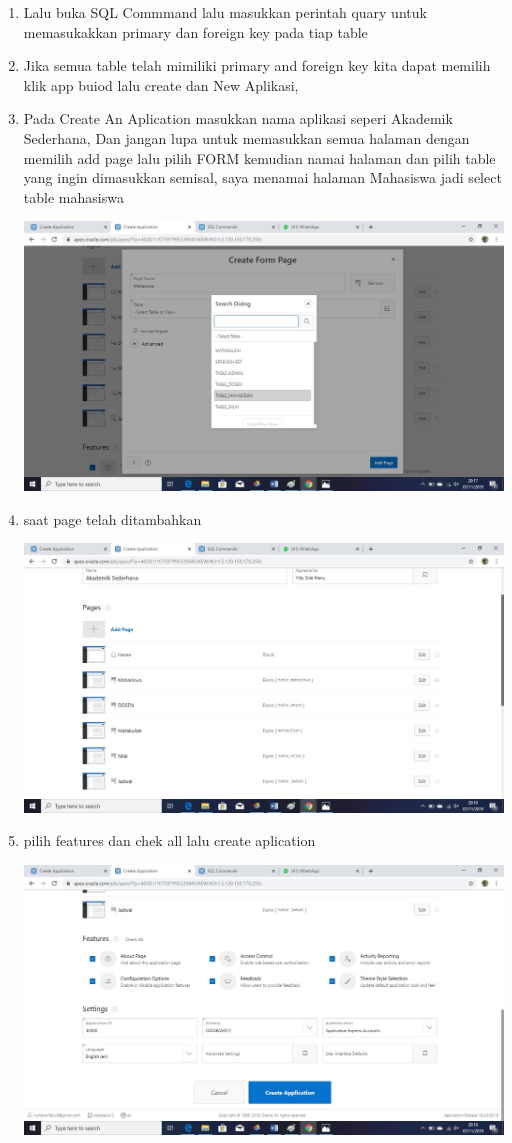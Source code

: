 \documentclass[a4paper,12pt]{report}
\begin{document}
\begin{enumerate}
\begin{center}
    \end{center}
    \item Lalu buka SQL Commmand lalu masukkan perintah quary untuk memasukakkan primary dan foreign key pada tiap table
    \item Jika semua table telah mimiliki primary and foreign key kita dapat memilih klik app buiod lalu create dan New Aplikasi,
    \item Pada Create An Aplication masukkan nama aplikasi seperi Akademik Sederhana, Dan jangan lupa untuk memasukkan semua halaman dengan memilih add page lalu pilih FORM kemudian namai halaman dan pilih table yang ingin dimasukkan semisal, saya menamai halaman Mahasiswa jadi select table mahasiswa
     \begin{center}
    \includegraphics[width=11cm\textwidth]{figure/17.jpg}
    \end{center}
    \item saat page telah ditambahkan
     \begin{center}
    \includegraphics[width=11cm\textwidth]{figure/15.jpg}
    \end{center}
    \item pilih features dan chek all lalu create aplication
     \begin{center}
    \includegraphics[width=11cm\textwidth]{figure/16.jpg}

\end{center}
\end{enumerate}
\end{document}
